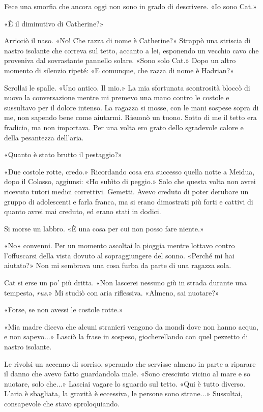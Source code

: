 Fece una smorfia che ancora oggi non sono in grado di descrivere. «Io
sono Cat.»

«È il diminutivo di Catherine?»

Arricciò il naso. «No! Che razza di nome è Catherine?» Strappò una
striscia di nastro isolante che correva sul tetto, accanto a lei,
esponendo un vecchio cavo che proveniva dal sovrastante pannello solare.
«Sono solo Cat.» Dopo un altro momento di silenzio ripeté: «E comunque,
che razza di nome è Hadrian?»

Scrollai le spalle. «Uno antico. Il mio.» La mia sfortunata scontrosità
bloccò di nuovo la conversazione mentre mi premevo una mano contro le
costole e sussultavo per il dolore intenso. La ragazza si mosse, con le
mani sospese sopra di me, non sapendo bene come aiutarmi. Risuonò un
tuono. Sotto di me il tetto era fradicio, ma non importava. Per una
volta ero grato dello sgradevole calore e della pesantezza dell'aria.

«Quanto è stato brutto il pestaggio?»

«Due costole rotte, credo.» Ricordando cosa era successo quella notte a
Meidua, dopo il Colosso, aggiunsi: «Ho subìto di peggio.» Solo che
questa volta non avrei ricevuto tutori medici correttivi. Gemetti. Avevo
creduto di poter derubare un gruppo di adolescenti e farla franca, ma si
erano dimostrati più forti e cattivi di quanto avrei mai creduto, ed
erano stati in dodici.

Si morse un labbro. «È una cosa per cui non posso fare niente.»

«No» convenni. Per un momento ascoltai la pioggia mentre lottavo contro
l'offuscarsi della vista dovuto al sopraggiungere del sonno. «Perché mi
hai aiutato?» Non mi sembrava una cosa furba da parte di una ragazza
sola.

Cat si erse un po' più dritta. «Non lascerei nessuno giù in strada
durante una tempesta, \emph{rus}.» Mi studiò con aria riflessiva.
«Almeno, sai nuotare?»

«Forse, se non avessi le costole rotte.»

«Mia madre diceva che alcuni stranieri vengono da mondi dove non hanno
acqua, e non sapevo...» Lasciò la frase in sospeso, giocherellando con
quel pezzetto di nastro isolante.

Le rivolsi un accenno di sorriso, sperando che servisse almeno in parte
a riparare il danno che avevo fatto guardandola male. «Sono cresciuto
vicino al mare e so nuotare, solo che...» Lasciai vagare lo sguardo sul
tetto. «Qui è tutto diverso. L'aria è sbagliata, la gravità è eccessiva,
le persone sono strane...» Sussultai, consapevole che stavo
sproloquiando.

